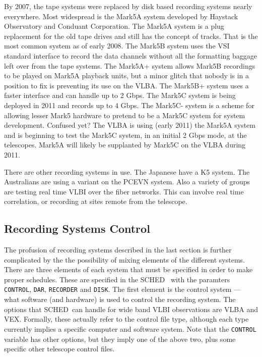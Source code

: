 \documentclass{report}
\newcommand{\schedb}{{\sc SCHED~}}
\begin{document}
By 2007, the tape systems were replaced by disk based recording
systems nearly everywhere.  Most widespread is the Mark5A system
developed by Haystack Observatory and Conduant Corporation.  The
Mark5A system is a plug replacement for the old tape drives and still
has the concept of tracks.  That is the most common system as of early
2008.  The Mark5B system uses the VSI standard interface to record the
data channels without all the formatting baggage left over from the
tape systems.  The Mark5A+ system allows Mark5B recordings to be
played on Mark5A playback units, but a minor glitch that nobody is in
a position to fix is preventing its use on the VLBA.  The Mark5B+
system uses a faster interface and can handle up to 2 Gbps.  The
Mark5C system is being deployed in 2011 and records up to 4 Gbps.  The
Mark5C- system is a scheme for allowing lesser Mark5 hardware to
pretend to be a Mark5C system for system development.  Confused yet?
The VLBA is using (early 2011) the Mark5A system and is beginning to
test the Mark5C system, in an initial 2 Gbps mode, at the telescopes.
Mark5A will likely be supplanted by Mark5C on the VLBA during 2011.

There are other recording systems in use.  The Japanese have a K5
system.  The Australians are using a variant on the PCEVN system.
Also a variety of groups are testing real time VLBI over the fiber
networks.  This can involve real time correlation, or recording at
sites remote from the telescope.

\subsection{\label{SSEC:RECCONTROL}Recording Systems Control}

The profusion of recording systems described in the last section is
further complicated by the the possibility of mixing elements of the
different systems.  There are three elements of each system that must
be specified in order to make proper schedules.  These are specified
in the \schedb {} with the
paramters {\tt CONTROL}, {\tt DAR}, {\tt RECORDER} and {\tt DISK}.
The first element is the control system --- what software (and
hardware) is used to control the recording system.  The options that
\schedb can handle for wide band VLBI observations are VLBA and VEX.
Formally, these actually refer to the control file type, although each
type currently implies a specific computer and software system.  Note
that the {\tt CONTROL} variable has other options, but they imply one
of the above two, plus some specific other telescope control files.
\end{document}
